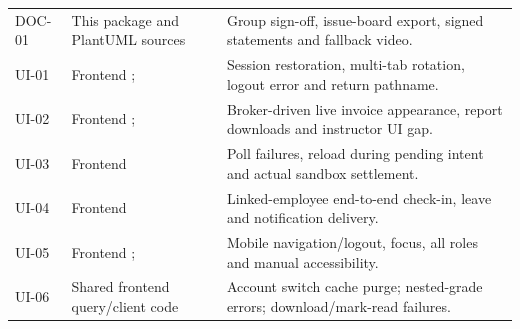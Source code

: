 \documentclass[10pt,a4paper]{article}
\begin{document}
\begin{longtable}{@{}L{31mm}L{60mm}L{69mm}@{}}
DOC-01 & This package and PlantUML sources & Group sign-off, issue-board export, signed statements and fallback video.\\
UI-01 & Frontend ;  & Session restoration, multi-tab rotation, logout error and return pathname.\\
UI-02 & Frontend ;  & Broker-driven live invoice appearance, report downloads and instructor UI gap.\\
UI-03 & Frontend  & Poll failures, reload during pending intent and actual sandbox settlement.\\
UI-04 & Frontend  & Linked-employee end-to-end check-in, leave and notification delivery.\\
UI-05 & Frontend ;  & Mobile navigation/logout, focus, all roles and manual accessibility.\\
UI-06 & Shared frontend query/client code & Account switch cache purge; nested-grade errors; download/mark-read failures.\\
\end{longtable}\normalsize
\end{document}
